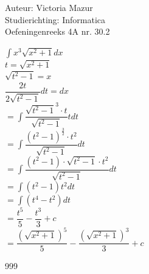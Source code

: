 \documentclass[a4paper]{article}
\begin{document}
  
\noindent \large Auteur: Victoria Mazur \\
\noindent \large Studierichting: Informatica\\
\noindent \large Oefeningenreeks 4A nr. 30.2\\

\medskip

\normalsize

$\displaystyle\int x^3\sqrt{x^2 + 1}dx$ \\

$t = \sqrt{x^2 + 1}$ \\

$\sqrt{t^2 - 1} = x$ \\

$\dfrac{2t}{2\sqrt{t^2 - 1}}dt = dx$ \\

$= \displaystyle\int \dfrac{\sqrt{t^2 - 1}^3 \cdot t}{\sqrt{t^2 - 1}}tdt$ \\

$= \displaystyle\int \dfrac{\left(t^2 - 1\right)^{\tfrac{3}{2}} \cdot t^2}{\sqrt{t^2 - 1}}dt$ \\

$= \displaystyle\int \dfrac{\left(t^2 - 1\right) \cdot \sqrt{t^2 - 1} \cdot t^2}{\sqrt{t^2 - 1}}dt$ \\

$= \displaystyle\int \left(t^2 - 1\right)t^2dt$ \\

$= \displaystyle\int \left(t^4 - t^2\right)dt$ \\

$= \dfrac{t^5}{5} - \dfrac{t^3}{3} + c$ \\

$= \dfrac{\left(\sqrt{x^2 + 1}\right)^5}{5} - \dfrac{\left(\sqrt{x^2 + 1}\right)^3}{3} + c$ \\

\begin{thebibliography}{999}
\end{thebibliography}
\end{document}
